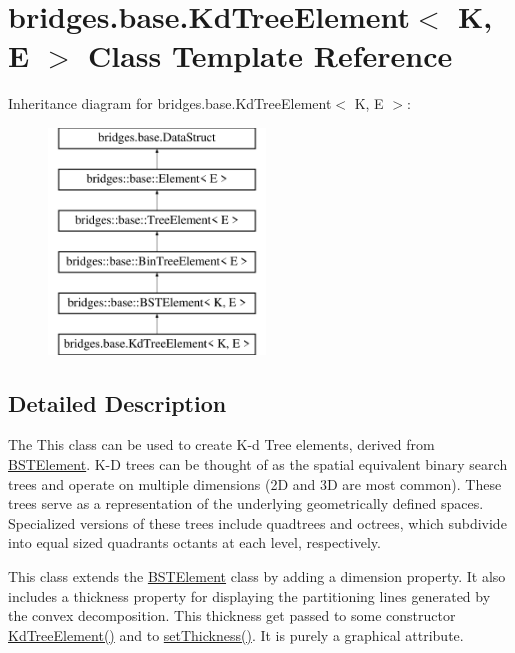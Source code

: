 \hypertarget{classbridges_1_1base_1_1_kd_tree_element}{}\section{bridges.\+base.\+Kd\+Tree\+Element$<$ K, E $>$ Class Template Reference}
\label{classbridges_1_1base_1_1_kd_tree_element}
Inheritance diagram for bridges.\+base.\+Kd\+Tree\+Element$<$ K, E $>$\+:\begin{figure}[H]
\begin{center}
\leavevmode
\includegraphics[height=6.000000cm]{classbridges_1_1base_1_1_kd_tree_element}
\end{center}
\end{figure}


\subsection{Detailed Description}
The This class can be used to create K-\/d Tree elements, derived from \mbox{\hyperlink{classbridges_1_1base_1_1_b_s_t_element}{B\+S\+T\+Element}}. K-\/D trees can be thought of as the spatial equivalent binary search trees and operate on multiple dimensions (2D and 3D are most common). These trees serve as a representation of the underlying geometrically defined spaces. Specialized versions of these trees include quadtrees and octrees, which subdivide into equal sized quadrants octants at each level, respectively. 

This class extends the \mbox{\hyperlink{classbridges_1_1base_1_1_b_s_t_element}{B\+S\+T\+Element}} class by adding a dimension property. It also includes a thickness property for displaying the partitioning lines generated by the convex decomposition. This thickness get passed to some constructor \mbox{\hyperlink{classbridges_1_1base_1_1_kd_tree_element_a11cb855f1a151714ee24901a9e91e0da}{Kd\+Tree\+Element()}} and to \mbox{\hyperlink{classbridges_1_1base_1_1_kd_tree_element_a52412fc59c743a8a0ede057ed2451be9}{set\+Thickness()}}. It is purely a graphical attribute.

